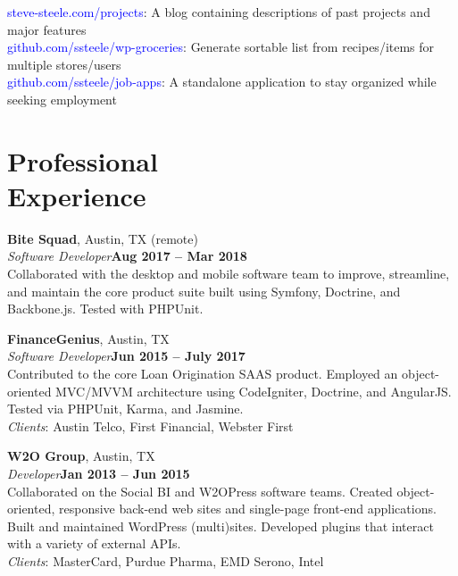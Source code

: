 \documentclass[margin,line]{resume}
\begin{document}
\begin{resume}
\textcolor{blue}{steve-steele.com/projects}: A blog containing descriptions of past projects and major features\vspace{0.3mm}\\
\textcolor{blue}{github.com/ssteele/wp-groceries}: Generate sortable list from recipes/items for multiple stores/users\vspace{0.3mm}\\
\textcolor{blue}{github.com/ssteele/job-apps}: A standalone application to stay organized while seeking employment



\section{\mysidestyle Professional\\Experience}

\textbf{Bite Squad}, Austin, TX {\footnotesize (remote)}
\vspace{2mm}\\
\textsl{Software Developer}\hfill \textbf{Aug 2017 -- Mar 2018}\vspace{1mm}\\
Collaborated with the desktop and mobile software team to improve, streamline, and maintain the core product suite built using Symfony, Doctrine, and Backbone.js. Tested with PHPUnit.

\textbf{FinanceGenius}, Austin, TX
\vspace{2mm}\\
\textsl{Software Developer}\hfill \textbf{Jun 2015 -- July 2017}\vspace{1mm}\\
Contributed to the core Loan Origination SAAS product. Employed an object-oriented MVC/MVVM architecture using CodeIgniter, Doctrine, and AngularJS. Tested via PHPUnit, Karma, and Jasmine.\vspace{1mm}\\
\textsl{Clients}: {\small Austin Telco, First Financial, Webster First}

\textbf{W2O Group}, Austin, TX
\vspace{2mm}\\
\textsl{Developer}\hfill \textbf{Jan 2013 -- Jun 2015}\vspace{1mm}\\
Collaborated on the Social BI and W2OPress software teams. Created object-oriented, responsive back-end web sites and single-page front-end applications. Built and maintained WordPress (multi)sites. Developed plugins that interact with a variety of external APIs.\vspace{1mm}\\
\textsl{Clients}: {\small MasterCard, Purdue Pharma, EMD Serono, Intel}


\end{resume}
\end{document}
